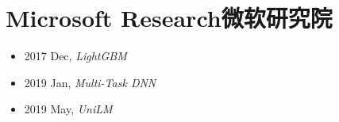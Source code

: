 \section{Microsoft Research微软研究院}\label{com:MSR}

\begin{itemize}
    \item 2017 Dec, \textit{LightGBM}\cite{LightGBM}
    \item 2019 Jan, \textit{Multi-Task DNN}\cite{MT-DNN}
    \item 2019 May, \textit{UniLM}\cite{UniLM}
    
\end{itemize}